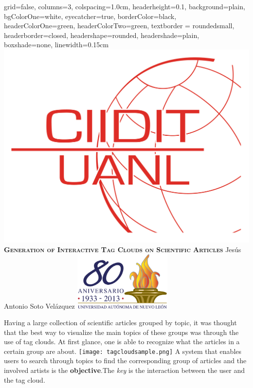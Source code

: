 \documentclass[a0paper, portrait]{baposter}
\begin{document}
\begin{poster}{
    grid=false,
    columns=3,
    colspacing=1.0cm, %
    headerheight=0.1\textheight,
    background=plain,
    bgColorOne=white,
    eyecatcher=true,
    borderColor=black,
    headerColorOne=green,
    headerColorTwo=green,
    textborder = roundedsmall,
    headerborder=closed,
    headershape=rounded,
    headershade=plain,
    boxshade=none,
    linewidth=0.15cm
}
  { \includegraphics[height=0.1\textheight]{ciidit.png} }
  {\bf\textsc{Generation of Interactive Tag Clouds on Scientific Articles}} 
  {
    Jes\'us Antonio Soto Vel\'azquez 
  }
  {
    \includegraphics[height=8.0em]{uanl.png}
  }


   {
    Having a large collection of scientific articles grouped by topic, it was thought that the best way to visualize the main topics of these groups was through the use of tag clouds. At first glance, one is able to recognize what the articles in a certain group are about.
    \newline
      \texttt{[image: tagcloudsample.png]}
    \newline
    A system that enables users to search through topics to find the corresponding group of articles and the involved artists is the {\bf objective}.The {\em key} is the interaction between the user and the tag cloud.
  }


\end{poster}
\end{document}
